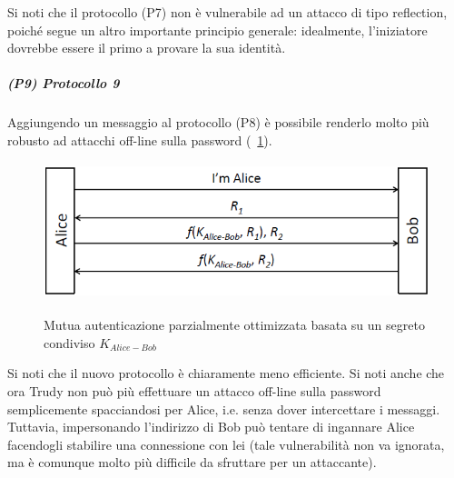 Si noti che il protocollo (P7) non è vulnerabile ad un attacco di tipo reflection, poiché segue un altro importante principio generale: idealmente, l'iniziatore dovrebbe essere il primo a provare la sua identità.
\subparagraph{(P9) Protocollo 9}
Aggiungendo un messaggio al protocollo (P8) è possibile renderlo molto più robusto ad attacchi off-line sulla password (\figurename~\ref{fig:ImgS45bis}).
\begin{figure}[htbp]
	\centering%
	\subfigure%
	{\includegraphics[height=4cm, width=12cm, keepaspectratio]{Immagini/autenticazione/ImgS45bis.png}}
	\caption{Mutua autenticazione parzialmente ottimizzata basata su un segreto condiviso $K_{Alice-Bob}$}\label{fig:ImgS45bis} 	
\end{figure}
Si noti che il nuovo protocollo è chiaramente meno efficiente. Si noti anche che ora Trudy non può più effettuare un attacco off-line sulla password semplicemente spacciandosi per Alice, i.e. senza dover intercettare i messaggi. Tuttavia, impersonando l'indirizzo di Bob può tentare di ingannare Alice facendogli stabilire una connessione con lei (tale vulnerabilità non va ignorata, ma è comunque molto più difficile da sfruttare per un attaccante).
